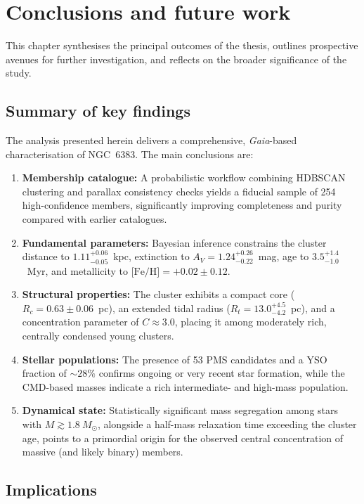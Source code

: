 \documentclass[../main.tex]{subfiles}
\begin{document}
\section{Conclusions and future work}
\label{sec:conclusions-overview}

This chapter synthesises the principal outcomes of the thesis, outlines prospective avenues for further investigation, and reflects on the broader significance of the study.

\subsection{Summary of key findings}
\label{subsec:conclusions-summary}

The analysis presented herein delivers a comprehensive, \textit{Gaia}-based characterisation of NGC~6383. The main conclusions are:
\begin{enumerate}
  \item \textbf{Membership catalogue:} A probabilistic workflow combining HDBSCAN clustering and parallax consistency checks yields a fiducial sample of 254 high-confidence members, significantly improving completeness and purity compared with earlier catalogues.
  \item \textbf{Fundamental parameters:} Bayesian inference constrains the cluster distance to $1.11^{+0.06}_{-0.05}$~kpc, extinction to $A_V = 1.24^{+0.26}_{-0.22}$~mag, age to $3.5^{+1.4}_{-1.0}$~Myr, and metallicity to $\text{[Fe/H]} = +0.02 \pm 0.12$.
  \item \textbf{Structural properties:} The cluster exhibits a compact core ($R_c = 0.63 \pm 0.06$~pc), an extended tidal radius ($R_t = 13.0^{+4.5}_{-4.2}$~pc), and a concentration parameter of $C \approx 3.0$, placing it among moderately rich, centrally condensed young clusters.
  \item \textbf{Stellar populations:} The presence of 53 PMS candidates and a YSO fraction of $\sim28\%$ confirms ongoing or very recent star formation, while the CMD-based masses indicate a rich intermediate- and high-mass population.
  \item \textbf{Dynamical state:} Statistically significant mass segregation among stars with $M\gtrsim1.8~M_\odot$, alongside a half-mass relaxation time exceeding the cluster age, points to a primordial origin for the observed central concentration of massive (and likely binary) members.
\end{enumerate}

\subsection{Implications}
\label{subsec:conclusions-implications}
\end{document}
